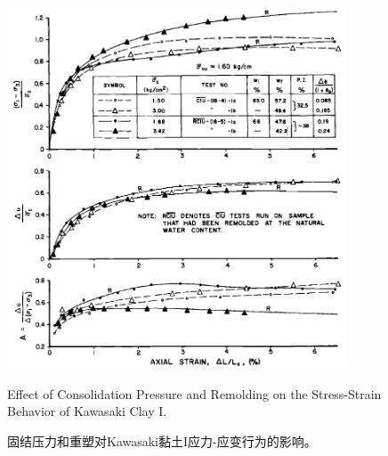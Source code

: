 \begin{figure}[!htbp]
\begin{minipage}[t]{0.48\textwidth}
        \includegraphics[width=0.9\textwidth]{figures/figure-14.png}
        \caption{Effect of Consolidation Pressure and Remolding on the Stress-Strain Behavior of Kawasaki Clay I.}
        \vspace{-5pt}
        \addtocounter{figure}{-1}
        \renewcommand{\figurename}{图}
        \caption{固结压力和重塑对Kawasaki黏土I应力-应变行为的影响。}
        \label{figure:14}
        \renewcommand{\figurename}{Figure}
    \end{minipage}
\end{figure}